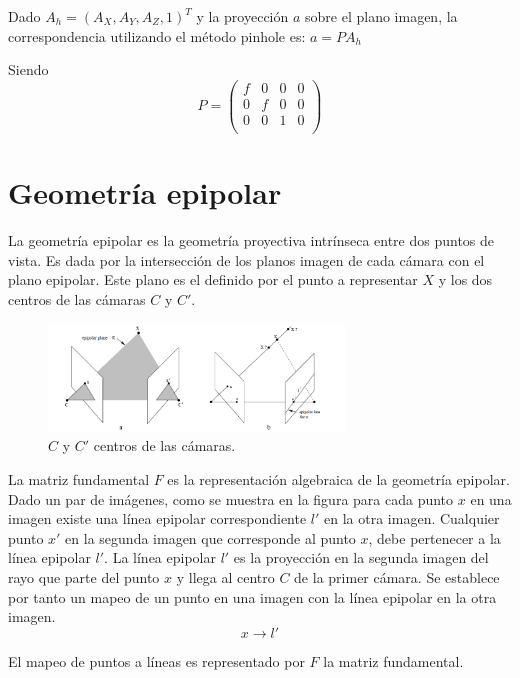 Dado $A_h = (A_X,A_Y,A_Z,1)^T$ y la proyección $a$ sobre el plano imagen, la correspondencia utilizando el método pinhole es:
$a=PA_h$

Siendo
\[
P = 
\begin{pmatrix}
f & 0 & 0 & 0 \\
0 & f & 0 & 0 \\
0 & 0 & 1 & 0 \\
\end{pmatrix}
\]

\section{Geometría epipolar}
La geometría epipolar\cite{LibroCompGrafica3} es la geometría proyectiva intrínseca entre dos puntos de vista. Es dada por la intersección de los planos imagen de cada cámara con el plano epipolar. Este plano es el definido por el punto a representar $X$ y los dos centros de las cámaras $C$ y $C'$.

\begin{figure}[H]
  \centering
    \includegraphics[width=0.7\textwidth]{./Cap2_videomapping/epipolar.PNG}
  \caption[Multiple View Geometry in Computer Vision, Fig. 9.1]{$C$ y $C'$ centros de las cámaras.}
  \label{fig:Epipolar}
\end{figure}
La matriz fundamental $F$ es la representación algebraica de la geometría epipolar.
Dado un par de imágenes, como se muestra en la figura para cada punto $x$ en una imagen existe una línea epipolar correspondiente $l'$ en la otra imagen. Cualquier punto $x'$ en la segunda imagen que corresponde al punto $x$, debe pertenecer a la línea epipolar $l'$.
La línea epipolar $l'$ es la proyección en la segunda imagen del rayo que parte del punto $x$ y llega al centro $C$ de la primer cámara. Se establece por tanto un mapeo de un punto en una imagen con la línea epipolar en la otra imagen.
\[  x \to l'
\]
 
El mapeo de puntos a líneas es representado por $F$ la matriz fundamental.

